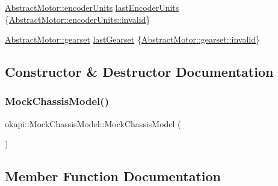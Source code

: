 \begin{DoxyCompactItemize}
\item 
\mbox{\hyperlink{classokapi_1_1AbstractMotor_ae811cd825099f2defadeb1b7f7e7764c}{Abstract\+Motor\+::encoder\+Units}} \mbox{\hyperlink{classokapi_1_1MockChassisModel_aa31360d4d2551b1b6b595a9546136876}{last\+Encoder\+Units}} \{\mbox{\hyperlink{classokapi_1_1AbstractMotor_ae811cd825099f2defadeb1b7f7e7764cafedb2d84cafe20862cb4399751a8a7e3}{Abstract\+Motor\+::encoder\+Units\+::invalid}}\}
\item 
\mbox{\hyperlink{classokapi_1_1AbstractMotor_a88aaa6ea2fa10f5520a537bbf26774d5}{Abstract\+Motor\+::gearset}} \mbox{\hyperlink{classokapi_1_1MockChassisModel_a5425e4b068b6a855eebf2e338250b645}{last\+Gearset}} \{\mbox{\hyperlink{classokapi_1_1AbstractMotor_a88aaa6ea2fa10f5520a537bbf26774d5afedb2d84cafe20862cb4399751a8a7e3}{Abstract\+Motor\+::gearset\+::invalid}}\}
\end{DoxyCompactItemize}


\subsection{Constructor \& Destructor Documentation}
\mbox{\label{classokapi_1_1MockChassisModel_a283b98e211e6b959a5b256af36bb7fbf}} 
\subsubsection{\texorpdfstring{MockChassisModel()}{MockChassisModel()}}
{\footnotesize\ttfamily okapi\+::\+Mock\+Chassis\+Model\+::\+Mock\+Chassis\+Model (\begin{DoxyParamCaption}{ }\end{DoxyParamCaption})\hspace{0.3cm}{\ttfamily [inline]}}



\subsection{Member Function Documentation}
\mbox{\label{classokapi_1_1MockChassisModel_a1f9e4fcb2a9d1d9c178e93c843363335}} 
